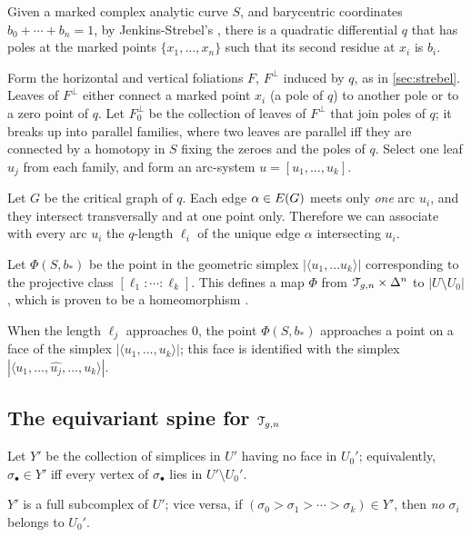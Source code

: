 Given a marked complex analytic curve $S$, and barycentric coordinates
$b_0 + \cdots + b_n = 1$, by Jenkins-Strebel's , there is a
quadratic differential $q$ that has poles at the marked points $\{ x_1,
\ldots, x_n \}$ such that its second residue at $x_i$ is $b_i$.

Form the horizontal and vertical foliations $F$, $F^\perp$ induced by $q$,
as in \ref{sec:strebel}.  Leaves of $F^\perp$ either connect a marked
point $x_i$ (a pole of $q$) to another pole or to a zero point of $q$.
Let $F^\perp_0$ be the collection of leaves of $F^\perp$ that join poles of
$q$; it breaks up into parallel families, where two leaves are
parallel iff they are connected by a homotopy in $S$ fixing the zeroes
and the poles of $q$.  Select one leaf $u_j$ from each family, and
form an arc-system $u = [u_1, \ldots, u_k]$.

Let $G$ be the critical graph of $q$.  Each edge $\alpha \in E(G)$ meets
only \emph{one} arc $u_i$, and they intersect transversally and at one
point only.  Therefore we can associate with every arc $u_i$ the
$q$-length $\ell_i$ of the unique edge $\alpha$ intersecting $u_i$.  

Let $\Phi(S, b_*)$ be the point in the geometric simplex $|\langle u_1, \ldots u_k\rangle|$
corresponding to the projective class $[\ell_1:\cdots:\ell_k]$.  This defines a
map $\Phi$ from $\mathcal{T}_{g,n} \times \Delta^n$ to $|U \setminus U_0|$, which is
proven to be a homeomorphism \cite{harer;cohomological-dimension,
  harer;cohomological-dimension,looijenga;cellular-decomposition}.

\begin{remark}
  \label{rem:approaching-face}
  When the length $\ell_j$ approaches $0$, the point $\Phi(S, b_*)$
  approaches a point on a face of the simplex $|\langle u_1, \ldots, u_k\rangle|$; this
  face is identified with the simplex $|\langle u_1, \ldots, \hat{u_j}, \ldots, u_k\rangle|$.
\end{remark}


\subsection{The equivariant spine for $\mathcal{T}_{g,n}$}
\label{sec:spine}

\begin{definition}
  Let $Y'$ be the collection of simplices in $U'$ having no face in
  $U_0'$; equivalently, $\sigma_\bullet \in Y'$ iff every vertex of $\sigma_\bullet$
  lies in $U' \setminus U_0'$.
\end{definition}
$Y'$ is a full subcomplex of $U'$; vice versa, if $(\sigma_0 > \sigma_1 > \cdots >
\sigma_k) \in Y'$, then \emph{no} $\sigma_i$ belongs to $U_0'$.  

